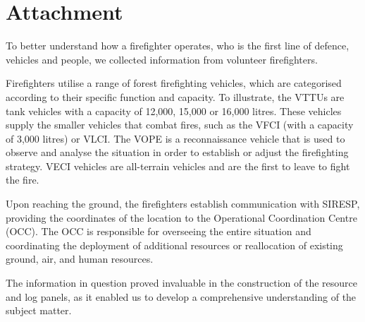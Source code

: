 \chapter{Attachment}
To better understand how a firefighter operates, who is the 
first line of defence, vehicles and people, we collected 
information from volunteer firefighters. \par
Firefighters utilise a range of forest firefighting vehicles, 
which are categorised according to their specific function and 
capacity. To illustrate, the VTTUs are tank vehicles with a 
capacity of 12,000, 15,000 or 16,000 litres. These vehicles 
supply the smaller vehicles that combat fires, such as the 
VFCI (with a capacity of 3,000 litres) or VLCI. The VOPE is a 
reconnaissance vehicle that is used to observe and analyse 
the situation in order to establish or adjust the firefighting
strategy. VECI vehicles are all-terrain vehicles and are the 
first to leave to fight the fire. \par
Upon reaching the ground, the firefighters establish 
communication with SIRESP, providing the coordinates of the 
location to the Operational Coordination Centre (OCC). The OCC
is responsible for overseeing the entire situation and 
coordinating the deployment of additional resources or 
reallocation of existing ground, air, and human resources. \par
The information in question proved invaluable in the construction 
of the resource and log panels, as it enabled us to develop a 
comprehensive understanding of the subject matter.
